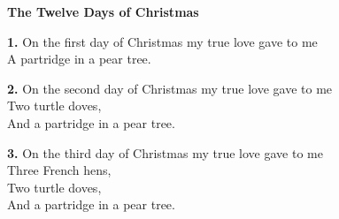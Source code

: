 \documentclass[a5paper,12pt]{article}
\begin{document}
\begin{center}{\Large\bfseries The Twelve Days of Christmas}\end{center}
\vspace{0.3em}
\textbf{1.} On the first day of Christmas my true love gave to me\\
A partridge in a pear tree.

\textbf{2.} On the second day of Christmas my true love gave to me\\
Two turtle doves,\\
And a partridge in a pear tree.

\textbf{3.} On the third day of Christmas my true love gave to me\\
Three French hens,\\
Two turtle doves,\\
And a partridge in a pear tree.
\end{document}
